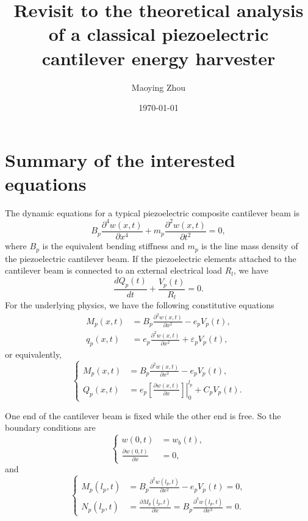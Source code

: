 \documentclass{article}
\title{Revisit to the theoretical analysis of a classical piezoelectric cantilever energy harvester}
\author{Maoying Zhou}
\date{\today}
\begin{document}
\maketitle

\section{Summary of the interested equations}

The dynamic equations for a typical piezoelectric composite cantilever beam is 
\begin{equation}
    B_p \frac{\partial^4 w(x,t)}{\partial x^4} + m_p \frac{\partial^2 w(x,t)}{\partial t^2} = 0,
\end{equation}
where $B_p$ is the equivalent bending stiffness and $m_p$ is the line mass density of the piezoelectric cantilever beam. If the piezoelectric elements attached to the cantilever beam is connected to an external electrical load $R_l$, we have 
\begin{equation}
    \frac{d Q_p(t)}{d t} + \frac{V_p(t)}{R_l} = 0.
\end{equation}
For the underlying physics, we have the following constitutive equations
\begin{equation}
    \begin{aligned}
        M_p(x,t) &= B_p \frac{\partial^2 w(x,t)}{\partial x^2} - e_p V_p(t), \\
        q_p(x,t) &= e_p \frac{\partial^2 w(x,t)}{\partial x^2} + \varepsilon_p V_p(t),
    \end{aligned}
\end{equation}
or equivalently,
\begin{equation}
    \left\{\begin{aligned}
        M_p(x,t) &= B_p \frac{\partial^2 w(x,t)}{\partial x^2} - e_p V_p(t), \\
        Q_p(x,t) &= e_p \left.\left[ \frac{\partial w(x,t)}{\partial x} \right]\right|_0^{l_p} + C_p V_p(t).
    \end{aligned}\right.
\end{equation}

One end of the cantilever beam is fixed while the other end is free. So the boundary conditions are
\begin{equation}
    \left\{\begin{aligned}
        w(0,t) &= w_b(t), \\
        \frac{\partial w(0,t)}{\partial x} &= 0,
    \end{aligned}\right.
\end{equation}
and
\begin{equation}
    \left\{\begin{aligned}
        M_p(l_p,t) &= B_p \frac{\partial^2 w(l_p,t)}{\partial x^2} - e_p V_p(t) = 0, \\
        N_p(l_p,t) &= \frac{\partial M_p(l_p,t)}{\partial x} = B_p \frac{\partial^3 w(l_p,t)}{\partial x^3} = 0.
    \end{aligned}\right.
\end{equation}
\end{document}
